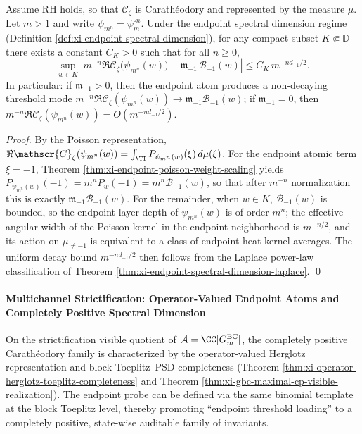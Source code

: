 \begin{theorem}\label{thm:xi-endpoint-renormalization-index}
Assume RH holds, so that \(\mathscr{C}_{\zeta}\) is Carath\'eodory and represented by the measure \(\mu\).
Let \(m>1\) and write \(\psi_{m^n}=\psi_m^{\circ n}\).
Under the endpoint spectral dimension regime (Definition \ref{def:xi-endpoint-spectral-dimension}), for any compact subset \(K\Subset\mathbb{D}\) there exists a constant \(C_K>0\) such that for all \(n\ge 0\),
\[
\sup_{w\in K}\left|
m^{-n}\Re \mathscr{C}_{\zeta}\!\bigl(\psi_{m^n}(w)\bigr)
-\mathfrak m_{-1}\,\mathcal{B}_{-1}(w)
\right|
\le C_K\,m^{-n d_{-1}/2}.
\]
In particular: if \(\mathfrak m_{-1}>0\), then the endpoint atom produces a non-decaying threshold mode
\(
m^{-n}\Re \mathscr{C}_{\zeta}(\psi_{m^n}(w))\to \mathfrak m_{-1}\mathcal{B}_{-1}(w)
\);
if \(\mathfrak m_{-1}=0\), then \(m^{-n}\Re \mathscr{C}_{\zeta}(\psi_{m^n}(w))=O(m^{-n d_{-1}/2})\).
\end{theorem}

\begin{proof}
By the Poisson representation,
\(
\Re \mathscr{C}_{\zeta}(\psi_{m^n}(w))
=\int_{\TT}P_{\psi_{m^n}(w)}(\xi)\,d\mu(\xi)
\).
For the endpoint atomic term \(\xi=-1\), Theorem \ref{thm:xi-endpoint-poisson-weight-scaling} yields
\(
P_{\psi_{m^n}(w)}(-1)=m^n P_w(-1)=m^n\mathcal{B}_{-1}(w)
\), so that after \(m^{-n}\) normalization this is exactly \(\mathfrak m_{-1}\mathcal{B}_{-1}(w)\).
For the remainder, when \(w\in K\), \(\mathcal{B}_{-1}(w)\) is bounded, so the endpoint layer depth of \(\psi_{m^n}(w)\) is of order \(m^n\);
the effective angular width of the Poisson kernel in the endpoint neighborhood is \(m^{-n/2}\), and its action on \(\mu_{\neq-1}\) is equivalent to a class of endpoint heat-kernel averages.
The uniform decay bound \(m^{-n d_{-1}/2}\) then follows from the Laplace power-law classification of Theorem \ref{thm:xi-endpoint-spectral-dimension-laplace}. \qed
\end{proof}

\paragraph{Multichannel Strictification: Operator-Valued Endpoint Atoms and Completely Positive Spectral Dimension}
On the strictification visible quotient of \(\mathcal{A}=\CC[G^{\mathrm{BC}}_m]\), the completely positive Carath\'eodory family is characterized by the operator-valued Herglotz representation and block Toeplitz--PSD completeness (Theorem \ref{thm:xi-operator-herglotz-toeplitz-completeness} and Theorem \ref{thm:xi-gbc-maximal-cp-visible-realization}).
The endpoint probe can be defined via the same binomial template at the block Toeplitz level, thereby promoting ``endpoint threshold loading'' to a completely positive, state-wise auditable family of invariants.

